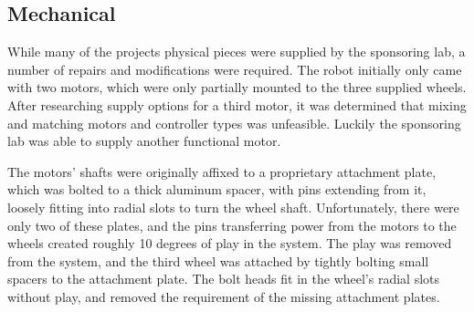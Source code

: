 \documentclass[12pt,conference,onecolumn,titlepage]{IEEEtran} %
\begin{document}
\subsection{Mechanical} %
\label{sec:mechanical}

While many of the projects physical pieces were supplied by the sponsoring lab, a number of repairs and modifications were required. The robot initially only came with two motors, which were only partially mounted to the three supplied wheels. After researching supply options for a third motor, it was determined that mixing and matching motors and controller types was unfeasible. Luckily the sponsoring lab was able to supply another functional motor.

The motors' shafts were originally affixed to a proprietary attachment plate, which was bolted to a thick aluminum spacer, with pins extending from it, loosely fitting into radial slots to turn the wheel shaft. Unfortunately, there were only two of these plates, and the pins transferring power from the motors to the wheels created roughly 10 degrees of play in the system. The play was removed from the system, and the third wheel was attached by tightly bolting small spacers to the attachment plate. The bolt heads fit in the wheel's radial slots without play, and removed the requirement of the missing attachment plates.
\end{document}
